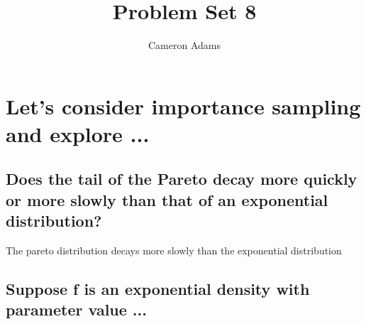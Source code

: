 \documentclass{article}\usepackage[]{graphicx}\usepackage[]{color}
\title{Problem Set 8}
\author{Cameron Adams}
\begin{document}

\maketitle





\section{Let’s consider importance sampling and explore ...}
\subsection{Does the tail of the Pareto decay more quickly or more slowly than that of an exponential distribution?}

The pareto distribution decays more slowly than the exponential distribution
\subsection{Suppose f is an exponential density with parameter value ...}
\end{document}
